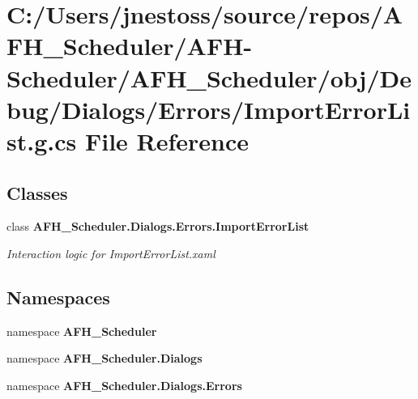 \section{C\+:/\+Users/jnestoss/source/repos/\+A\+F\+H\+\_\+\+Scheduler/\+A\+F\+H-\/\+Scheduler/\+A\+F\+H\+\_\+\+Scheduler/obj/\+Debug/\+Dialogs/\+Errors/\+Import\+Error\+List.g.\+cs File Reference}
\label{_debug_2_dialogs_2_errors_2_import_error_list_8g_8cs}
\subsection*{Classes}
\begin{DoxyCompactItemize}
\item 
class \textbf{ A\+F\+H\+\_\+\+Scheduler.\+Dialogs.\+Errors.\+Import\+Error\+List}
\begin{DoxyCompactList}\small\item\em Interaction logic for Import\+Error\+List.\+xaml \end{DoxyCompactList}\end{DoxyCompactItemize}
\subsection*{Namespaces}
\begin{DoxyCompactItemize}
\item 
namespace \textbf{ A\+F\+H\+\_\+\+Scheduler}
\item 
namespace \textbf{ A\+F\+H\+\_\+\+Scheduler.\+Dialogs}
\item 
namespace \textbf{ A\+F\+H\+\_\+\+Scheduler.\+Dialogs.\+Errors}
\end{DoxyCompactItemize}
